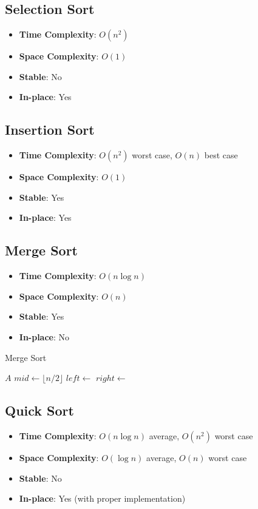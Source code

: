\documentclass[11pt]{article}
\theoremstyle{definition}
\begin{document}
\subsection{Selection Sort}
\begin{itemize}
    \item \textbf{Time Complexity}: $O(n^2)$
    \item \textbf{Space Complexity}: $O(1)$
    \item \textbf{Stable}: No
    \item \textbf{In-place}: Yes
\end{itemize}

\subsection{Insertion Sort}
\begin{itemize}
    \item \textbf{Time Complexity}: $O(n^2)$ worst case, $O(n)$ best case
    \item \textbf{Space Complexity}: $O(1)$
    \item \textbf{Stable}: Yes
    \item \textbf{In-place}: Yes
\end{itemize}

\subsection{Merge Sort}
\begin{itemize}
    \item \textbf{Time Complexity}: $O(n \log n)$
    \item \textbf{Space Complexity}: $O(n)$
    \item \textbf{Stable}: Yes
    \item \textbf{In-place}: No
\end{itemize}

\begin{algorithm}
\caption{Merge Sort}
\begin{algorithmic}[1]
        \State \Return $A$
    \EndIf
    \State $mid \gets \lfloor n/2 \rfloor$
    \State $left \gets$ 
    \State $right \gets$ 
    \State \Return {}
\EndProcedure
\end{algorithmic}
\end{algorithm}

\subsection{Quick Sort}
\begin{itemize}
    \item \textbf{Time Complexity}: $O(n \log n)$ average, $O(n^2)$ worst case
    \item \textbf{Space Complexity}: $O(\log n)$ average, $O(n)$ worst case
    \item \textbf{Stable}: No
    \item \textbf{In-place}: Yes (with proper implementation)
\end{itemize}
\end{document}
